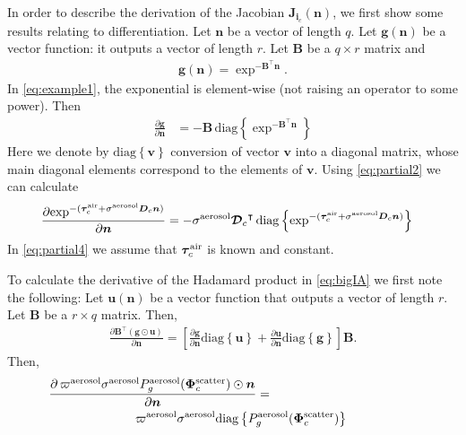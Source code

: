 \documentclass[10pt,letterpaper]{article}
\newcommand{\OpDistance}{\bm{\mathcal{D}}}
\newcommand{\OpDiag}[1]{\mathrm{diag}\left\{#1\right\}}
\newcommand{\PartDeriv}[2]{\frac{\partial{#1}}{\partial{#2}}}
\newcommand{\vect}[1]{\bm{#1}}
\newcommand{\mat}[1]{\bm{#1}}
\newcommand{\transpose}[1]{{#1}^\intercal}
\begin{document}
In order to describe the derivation of the Jacobian ${\bm J}_{{\bm
    i}_c}({\bm n})$, we first show some results relating to
differentiation. Let $\vect{n}$ be a vector of length $q$. Let
$\vect{g}(\vect{n})$ be a vector function: it outputs a vector of
length $r$. Let $\mat{B}$ be a $q \times r$ matrix and
\begin{align}
  \vect{g}(\vect{n}) = \exp^{-\transpose{\mat{B}}\vect{n}}.
  \label{eq:example1}
\end{align}
In \cref{eq:example1}, the exponential is element-wise (not raising an
operator to some power). Then
\begin{align}
  \label{eq:partial2}
  \PartDeriv{\vect{g}}{\vect{n}} &= - \mat{B} \,
  \OpDiag{\exp^{-\transpose{\mat{B}}\vect{n}}}
\end{align}
Here we denote by $\OpDiag{\vect{v}}$ conversion of vector $\vect{v}$
into a diagonal matrix, whose main diagonal elements correspond to the
elements of $\vect{v}$. Using \cref{eq:partial2} we can calculate
\begin{align}
  \label{eq:partial4}
  \PartDeriv{\exp^{-(\vect{\tau}_c^{\rm air} + {\sigma}^{\rm aerosol}
      {\bm D}_c {\bm n})}}
  {\vect{n}} &= - {\sigma}^{\rm aerosol}\transpose{\OpDistance_c} \,
  \OpDiag{\exp^{-(\vect{\tau}_c^{\rm air} + {\sigma}^{\rm aerosol}
      {\bm D}_c {\bm n})}}
\end{align}
In \cref{eq:partial4} we assume that $\vect{\tau}_c^{\rm air}$ is
known and constant.

To calculate the derivative of the Hadamard product in \cref{eq:bigIA}
we first note the following: Let $\vect{u}(\vect{n})$ be a vector
function that outputs a vector of length $r$. Let $\mat{B}$ be a $r
\times q$ matrix. Then,
\begin{align}
  \label{eq:partial1}
  \PartDeriv{\transpose{\mat{B}} (\vect{g} \odot \vect{u})}{\vect{n}}
  = \left[ \PartDeriv{\vect{g}}{\vect{n}} \OpDiag{\vect{u}} +
    \PartDeriv{\vect{u}}{\vect{n}} \OpDiag{\vect{g}} \right] \mat{B}.
\end{align}
Then,
\begin{align}
  \label{eq:partial3}
  \PartDeriv{\, \varpi^{\rm aerosol}\sigma^{\rm aerosol} P^{\rm
      aerosol}_g(\vect{\Phi}^{\rm scatter}_c) \odot{\bm n}}{\vect{n}}
  =
  \;\;\;\;\;\;\;\;\;\;\;\;\;\;\;\;\;\;\;\;\;\;\;\;\;\;\;\;\;\;\;\;\;\;\;\;\;\;\;\;\;\;
  \nonumber \\
  \varpi^{\rm aerosol}\sigma^{\rm aerosol}\OpDiag{P^{\rm
      aerosol}_g(\vect{\Phi}^{\rm scatter}_c)}
  \;\;\;\;\;\;\;\;\;\;\;\;\;\;\;\;\;\;\;\;
\end{align}
\end{document}
